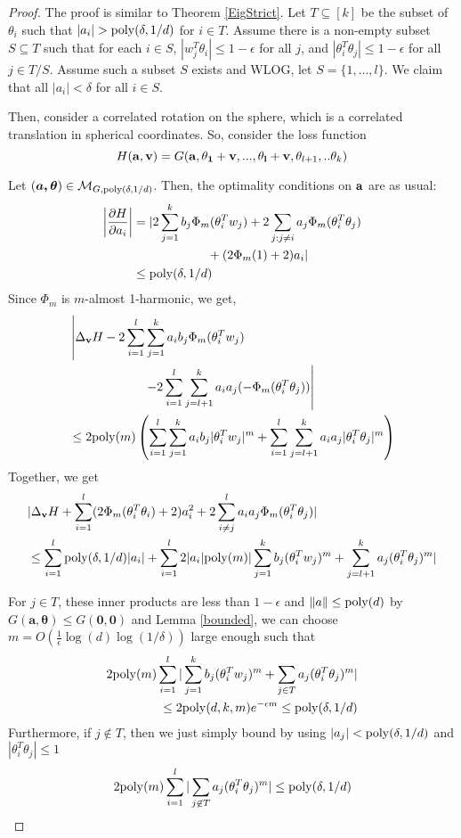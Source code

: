 \begin{proof}
  The proof is similar to Theorem \ref{EigStrict}. Let $T \subseteq [k]$ be the subset of $\theta_i$ such that $|a_i| > \mathrm{poly}(\delta,1/d)$ for $i \in T$. Assume there is a non-empty subset $S \subseteq T$ such that for each $i \in S$, $|w_j^T\theta_i| \leq 1-\epsilon$ for all $j$, and $|\theta_i ^T\theta_j| \leq 1-\epsilon$ for all $j\in T/S$. Assume such a subset $S$ exists and WLOG, let $S = \{1,\dots,l\}$. We claim that all $|a_i| < \delta$ for all $i \in S$. 
  
  Then, consider a correlated rotation on the
  sphere, which is a correlated translation in spherical
  coordinates. So, consider the loss function 
%
\[ H({\bf a, v}) = G({\bf a,\theta_1+v,...,\theta_l+v},\theta_{l+1},..\theta_k)\]

Let $(\boldsymbol{a,\theta}) \in \mathcal{M}_{G, \mathrm{poly}(\delta,1/d)}$. Then,
the optimality conditions on ${\bf a}$ are as usual:
%
\begin{align*}
   \left| \frac{\partial H}{\partial a_i} \right| & = \lvert 2\sum_{j=1}^k b_j \Phi_m(\theta_i^T w_j) +
    2\sum_{j: j\neq i} a_j \Phi_m(\theta_i^T\theta_j) \\
& \qquad \qquad \qquad + (2\Phi_m(1) +
    2)a_i \rvert \\
& \leq \mathrm{poly}(\delta,1/d)
\end{align*}
%
Since $\Phi_m$ is $m$-almost 1-harmonic, we get,
%
\begin{align*}
  &  \left| \Delta_{{\bf v}} H -  2\sum_{i=1}^l\sum_{j=1}^k a_i b_j
    \Phi_m(\theta_i^Tw_j) \right. \\
& \qquad \qquad \qquad \left.- 2\sum_{i=1}^l\sum_{j= l+1}^k
  a_ia_j(-\Phi_m(\theta_i^T\theta_j)) \right| \\
  & \leq   2\mathrm{poly}(m)\left(\sum_{i=1}^l\sum_{j=1}^k a_i b_j  |\theta_i^Tw_j|^m+\sum_{i=1}^l\sum_{j= l+1}^k a_ia_j|\theta_i^T\theta_j|^m\right)
\end{align*}
%
Together, we get
%
\begin{align*}
& |\Delta_{{\bf v}}H + \sum_{i=1}^l (2\Phi_m(\theta_i^T\theta_i)+2)a_i^2 + 2\sum_{i \neq j}^l a_ia_j\Phi_m(\theta_i^T\theta_j)| \\
& \leq \sum_{i=1}^l\mathrm{poly}(\delta,1/d) |a_i| +\sum_{i=1}^l 2|a_i|\mathrm{poly}(m)|\sum_{j=1}^k b_j
  (\theta_i^Tw_j)^m +  \sum_{j=l+1}^k  a_j(\theta_i^T\theta_j)^m|
\\
\end{align*}

For $j\in T$, these inner products are less than
$1-\epsilon$ and $\|a\| \leq \mathrm{poly}(d)$ by
$G(\boldsymbol{a,\theta}) \leq G(\boldsymbol{0,0})$ and Lemma
\ref{bounded}, we can choose
$m = O(\frac{1}{\epsilon}\log(d)\log(1/\delta))$ large enough such
that
%
\begin{align*}
 2\mathrm{poly}(m)\sum_{i=1}^l|\sum_{j=1}^k b_j (\theta_i^Tw_j)^m +
  \sum_{j \in T}  a_j(\theta_i^T\theta_j)^m| \\
 \leq  2\mathrm{poly}(d,k,m)e^{-\epsilon m} \leq \mathrm{poly}(\delta,1/d)
\end{align*}
%
Furthermore, if $j\not \in T$, then we just simply bound by using $|a_j| < \mathrm{poly}(\delta,1/d)$ and $|\theta_i^T\theta_j| \leq 1$
\[2\mathrm{poly}(m)\sum_{i=1}^l|
  \sum_{j \not\in T}  a_j(\theta_i^T\theta_j)^m|  \leq \mathrm{poly}(\delta,1/d)\]


\end{proof}
